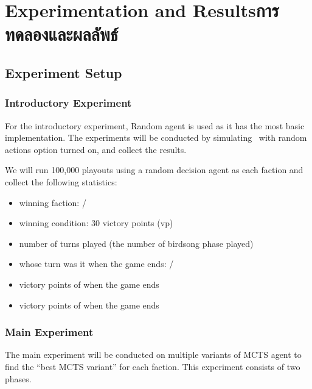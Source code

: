 \chapter{
    \ifenglish Experimentation and Results\else การทดลองและผลลัพธ์\fi
}



\section{Experiment Setup}

\subsection{Introductory Experiment}
For the introductory experiment, Random agent is used as it has the most basic implementation. The experiments will be conducted by simulating \RootOurs \ with random actions option turned on, and collect the results. 

We will run 100,000 \glspl{playout} using a random decision agent as each faction and collect the following statistics:
\begin{itemize}
    \item winning faction: \Marquise{} / \Eyrie
    \item winning condition: 30 victory points (vp)
    \item number of turns played (the number of birdsong phase played)
    \item whose turn was it when the game ends: \Marquise{} / \Eyrie
    \item victory points of \Marquise{} when the game ends
    \item victory points of \Eyrie{} when the game ends
\end{itemize}

\subsection{Main Experiment}
The main experiment will be conducted on multiple variants of MCTS agent to find the ``best MCTS variant'' for each faction. This experiment consists of two phases. 

